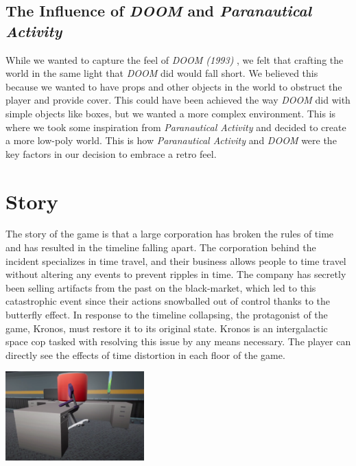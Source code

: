 \documentclass{sigchi}
\begin{document}
\subsection{The Influence of \textit{DOOM} and \textit{Paranautical Activity}}
While we wanted to capture the feel of \textit{DOOM (1993)} \cite{doom}, we felt that crafting the world in the same light that \textit{DOOM} did would fall short. We believed this because we wanted to have props and other objects in the world to obstruct the player and provide cover. This could have been achieved the way \textit{DOOM} did with simple objects like boxes, but we wanted a more complex environment. This is where we took some inspiration from \textit{Paranautical Activity} \cite{paranautical} and decided to create a more low-poly world. This is how \textit{Paranautical Activity} \cite{paranautical} and \textit{DOOM} were the key factors in our decision to embrace a retro feel.

\section{Story}
The story of the game is that a large corporation has broken the rules of time and has resulted in the timeline falling apart. The corporation behind the incident specializes in time travel, and their business allows people to time travel without altering any events to prevent ripples in time. The company has secretly been selling artifacts from the past on the black-market, which led to this catastrophic event since their actions snowballed out of control thanks to the butterfly effect. In response to the timeline collapsing, the protagonist of the game, Kronos, must restore it to its original state. Kronos is an intergalactic space cop tasked with resolving this issue by any means necessary. The player can directly see the effects of time distortion in each floor of the game.
\begin{center}
    \includegraphics[width=0.4\textwidth]{timeMessedUp.png}
    \label{fig:time-dist}
\end{center}
\end{document}
